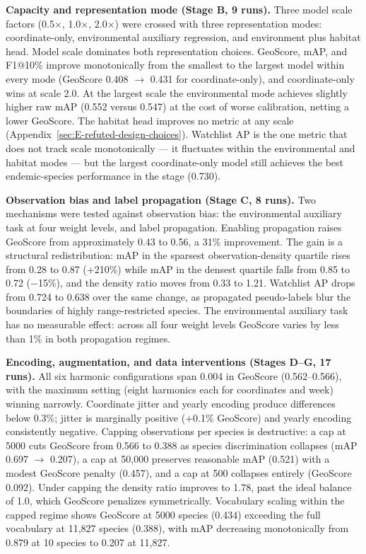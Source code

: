 \textbf{Capacity and representation mode (Stage B, 9 runs).} Three model scale factors (0.5$\times$, 1.0$\times$, 2.0$\times$) were crossed with three representation modes: coordinate-only, environmental auxiliary regression, and environment plus habitat head. Model scale dominates both representation choices. GeoScore, mAP, and F1@10\% improve monotonically from the smallest to the largest model within every mode (GeoScore 0.408 $\rightarrow$ 0.431 for coordinate-only), and coordinate-only wins at scale 2.0. At the largest scale the environmental mode achieves slightly higher raw mAP (0.552 versus 0.547) at the cost of worse calibration, netting a lower GeoScore. The habitat head improves no metric at any scale (Appendix~\ref{sec:E-refuted-design-choices}). Watchlist AP is the one metric that does not track scale monotonically --- it fluctuates within the environmental and habitat modes --- but the largest coordinate-only model still achieves the best endemic-species performance in the stage (0.730).

\textbf{Observation bias and label propagation (Stage C, 8 runs).} Two mechanisms were tested against observation bias: the environmental auxiliary task at four weight levels, and label propagation. Enabling propagation raises GeoScore from approximately 0.43 to 0.56, a 31\% improvement. The gain is a structural redistribution: mAP in the sparsest observation-density quartile rises from 0.28 to 0.87 (+210\%) while mAP in the densest quartile falls from 0.85 to 0.72 ($-$15\%), and the density ratio moves from 0.33 to 1.21. Watchlist AP drops from 0.724 to 0.638 over the same change, as propagated pseudo-labels blur the boundaries of highly range-restricted species. The environmental auxiliary task has no measurable effect: across all four weight levels GeoScore varies by less than 1\% in both propagation regimes.

\textbf{Encoding, augmentation, and data interventions (Stages D--G, 17 runs).} All six harmonic configurations span 0.004 in GeoScore (0.562--0.566), with the maximum setting (eight harmonics each for coordinates and week) winning narrowly. Coordinate jitter and yearly encoding produce differences below 0.3\%; jitter is marginally positive (+0.1\% GeoScore) and yearly encoding consistently negative. Capping observations per species is destructive: a cap at 5000 cuts GeoScore from 0.566 to 0.388 as species discrimination collapses (mAP 0.697 $\rightarrow$ 0.207), a cap at 50,000 preserves reasonable mAP (0.521) with a modest GeoScore penalty (0.457), and a cap at 500 collapses entirely (GeoScore 0.092). Under capping the density ratio improves to 1.78, past the ideal balance of 1.0, which GeoScore penalizes symmetrically. Vocabulary scaling within the capped regime shows GeoScore at 5000 species (0.434) exceeding the full vocabulary at 11,827 species (0.388), with mAP decreasing monotonically from 0.879 at 10 species to 0.207 at 11,827.

